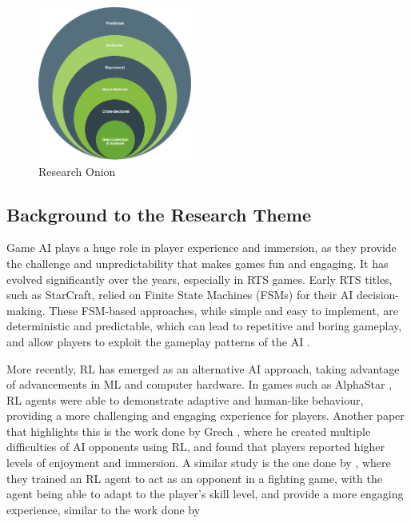 \documentclass[conference]{IEEEtran}
\begin{document}
\begin{figure}[htbp]
	\centering
	\includegraphics[width=0.45\textwidth]{Images/Research_Onion.PNG}
	\caption{Research Onion}
	\label{fig:research_onion}
\end{figure}


\subsection{Background to the Research Theme}

Game AI plays a huge role in player experience and immersion, as they provide the challenge and unpredictability that makes games fun and engaging.
It has evolved significantly over the years, especially in RTS games. Early RTS titles, such as StarCraft, relied on Finite State Machines (FSMs) for their AI decision-making. These FSM-based approaches,
while simple and easy to implement, are deterministic and predictable, which can lead to repetitive and boring gameplay, and allow players to exploit the gameplay patterns of the AI \cite{noauthor_finite_2020}
\cite{jagdale_finite_2021}.


More recently, RL has emerged as an alternative AI approach, taking advantage of advancements in ML and computer hardware. In games such as AlphaStar \cite{vinyals_grandmaster_2019}, RL agents were able to
demonstrate adaptive and human-like behaviour, providing a more challenging and engaging experience for players. Another paper that highlights this is the work done by Grech \cite{grech_creating_2023},
where he created multiple difficulties of AI opponents using RL, and found that players reported higher levels of enjoyment and immersion. A similar study is the one done by \cite{bin_ramlan_implementation_2021},
where they trained an RL agent to act as an opponent in a fighting game, with the agent being able to adapt to the player's skill level, and provide a more engaging experience, similar to the work done by \cite{vinyals_grandmaster_2019}
\end{document}
